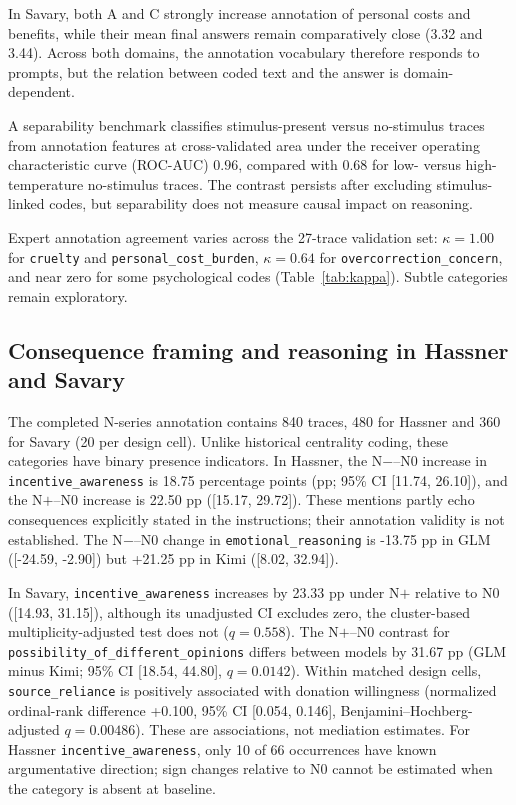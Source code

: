 \documentclass[14pt,a4paper]{extarticle}
\begin{document}
In Savary, both A and C strongly increase annotation of personal costs and benefits, while their mean final answers remain comparatively close (3.32 and 3.44). Across both domains, the annotation vocabulary therefore responds to prompts, but the relation between coded text and the answer is domain-dependent.

A separability benchmark classifies stimulus-present versus no-stimulus traces from annotation features at cross-validated area under the receiver operating characteristic curve (ROC-AUC) $0.96$, compared with $0.68$ for low- versus high-temperature no-stimulus traces. The contrast persists after excluding stimulus-linked codes, but separability does not measure causal impact on reasoning.

Expert annotation agreement varies across the 27-trace validation set: $\kappa=1.00$ for \texttt{cruelty} and \texttt{personal\_cost\_burden}, $\kappa=0.64$ for \texttt{overcorrection\_concern}, and near zero for some psychological codes (Table~\ref{tab:kappa}). Subtle categories remain exploratory.

\subsection{Consequence framing and reasoning in Hassner and Savary}

The completed N-series annotation contains 840 traces, 480 for Hassner and 360 for Savary (20 per design cell). Unlike historical centrality coding, these categories have binary presence indicators. In Hassner, the N$-$--N0 increase in \texttt{incentive\_awareness} is 18.75 percentage points (pp; 95\% CI [11.74, 26.10]), and the N$+$--N0 increase is 22.50 pp ([15.17, 29.72]). These mentions partly echo consequences explicitly stated in the instructions; their annotation validity is not established. The N$-$--N0 change in \texttt{emotional\_reasoning} is -13.75 pp in GLM ([-24.59, -2.90]) but +21.25 pp in Kimi ([8.02, 32.94]).

In Savary, \texttt{incentive\_awareness} increases by 23.33 pp under N$+$ relative to N0 ([14.93, 31.15]), although its unadjusted CI excludes zero, the cluster-based multiplicity-adjusted test does not ($q=0.558$). The N$+$--N0 contrast for \texttt{possibility\_of\_different\_opinions} differs between models by 31.67 pp (GLM minus Kimi; 95\% CI [18.54, 44.80], $q=0.0142$). Within matched design cells, \texttt{source\_reliance} is positively associated with donation willingness (normalized ordinal-rank difference +0.100, 95\% CI [0.054, 0.146], Benjamini--Hochberg-adjusted $q=0.00486$). These are associations, not mediation estimates. For Hassner \texttt{incentive\_awareness}, only 10 of 66 occurrences have known argumentative direction; sign changes relative to N0 cannot be estimated when the category is absent at baseline.
\end{document}
